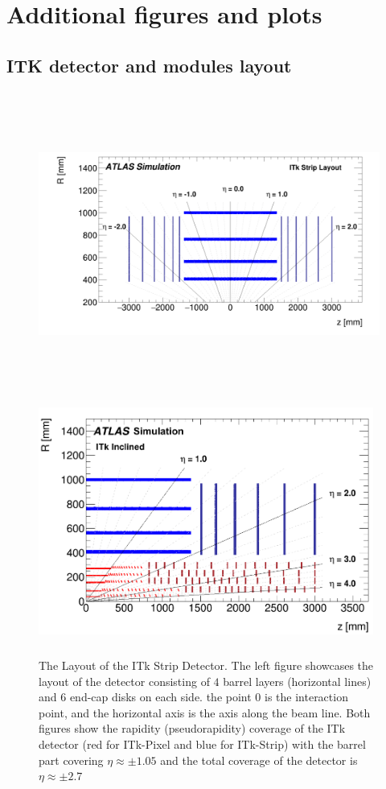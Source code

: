 \chapter{Additional figures and plots} %

\label{AppendixA} %


\section{ITK detector and modules layout}
\begin{figure}[h]
    \centering
    \includegraphics[width=12cm,height=10cm,keepaspectratio]{Figures/modules/Appendix/layout1.png}
    \includegraphics[width=11cm,height=8cm,keepaspectratio]{Figures/modules/Appendix/layout2.png}
    \caption{The Layout of the ITk Strip Detector. The left figure showcases the layout of the detector consisting of $4$ barrel layers (horizontal lines) and $6$ end-cap disks on each side. the point $0$ is the interaction point, and the horizontal axis is the axis along the beam line. Both figures show the rapidity (pseudorapidity) coverage of the ITk detector (red for ITk-Pixel and blue for ITk-Strip) with the barrel part covering $\eta \approx \pm 1.05$ and the total coverage of the detector is $\eta \approx \pm 2.7$\cite{Collaboration:390920} }
    \label{fig:additionalLayout}
\end{figure}

